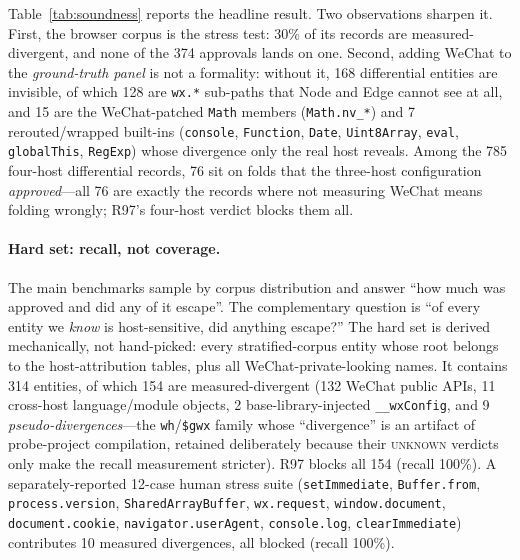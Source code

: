 \documentclass[sigconf,nonacm]{acmart}
\begin{document}
Table~\ref{tab:soundness} reports the headline result. Two observations sharpen it. First, the browser corpus is the stress test: 30\% of its records are measured-divergent, and none of the 374 approvals lands on one. Second, adding WeChat to the \emph{ground-truth panel} is not a formality: without it, 168 differential entities are invisible, of which 128 are \texttt{wx.*} sub-paths that Node and Edge cannot see at all, and 15 are the WeChat-patched \texttt{Math} members (\texttt{Math.nv\_*}) and 7 rerouted/wrapped built-ins (\texttt{console}, \texttt{Function}, \texttt{Date}, \texttt{Uint8Array}, \texttt{eval}, \texttt{globalThis}, \texttt{RegExp}) whose divergence only the real host reveals. Among the 785 four-host differential records, 76 sit on folds that the three-host configuration \emph{approved}---all 76 are exactly the records where not measuring WeChat means folding wrongly; R97's four-host verdict blocks them all.

\paragraph{Hard set: recall, not coverage.} The main benchmarks sample by corpus distribution and answer ``how much was approved and did any of it escape''. The complementary question is ``of every entity we \emph{know} is host-sensitive, did anything escape?'' The hard set is derived mechanically, not hand-picked: every stratified-corpus entity whose root belongs to the host-attribution tables, plus all WeChat-private-looking names. It contains 314 entities, of which 154 are measured-divergent (132 WeChat public APIs, 11 cross-host language/module objects, 2 base-library-injected \texttt{\_\_wxConfig}, and 9 \emph{pseudo-divergences}---the \texttt{wh}/\texttt{\$gwx} family whose ``divergence'' is an artifact of probe-project compilation, retained deliberately because their \textsc{unknown} verdicts only make the recall measurement stricter). R97 blocks all 154 (recall 100\%). A separately-reported 12-case human stress suite (\texttt{setImmediate}, \texttt{Buffer.from}, \texttt{process.version}, \texttt{SharedArrayBuffer}, \texttt{wx.request}, \texttt{window.document}, \texttt{document.cookie}, \texttt{navigator.userAgent}, \texttt{console.log}, \texttt{clearImmediate}) contributes 10 measured divergences, all blocked (recall 100\%).
\end{document}
